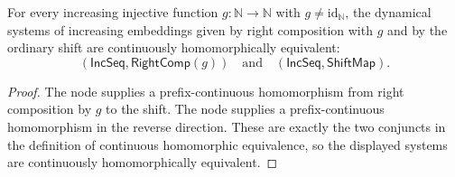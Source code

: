 \begin{theorem}[MainProp]
For every increasing injective function $g:\mathbb N\to\mathbb N$ with
$g\neq\mathrm{id}_{\mathbb N}$, the dynamical systems of increasing
embeddings given by right composition with $g$ and by the ordinary shift
are continuously homomorphically equivalent:
\[
(\mathsf{IncSeq},\mathsf{RightComp}(g))
\quad\text{and}\quad
(\mathsf{IncSeq},\mathsf{ShiftMap}).
\]
\end{theorem}
\begin{proof}
The node  supplies a prefix-continuous homomorphism from
right composition by $g$ to the shift.  The node  supplies
a prefix-continuous homomorphism in the reverse direction.  These are exactly
the two conjuncts in the definition of continuous homomorphic equivalence,
so the displayed systems are continuously homomorphically equivalent.
\end{proof}
